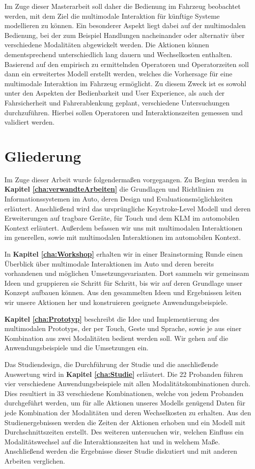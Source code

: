 Im Zuge dieser Masterarbeit soll daher die Bedienung im Fahrzeug beobachtet werden, mit dem Ziel die multimodale Interaktion für künftige Systeme modellieren zu können.
Ein besonderer Aspekt liegt dabei auf der multimodalen Bedienung, bei der zum Beispiel Handlungen nacheinander oder alternativ über verschiedene Modalitäten abgewickelt werden.
Die Aktionen können dementsprechend unterschiedlich lang dauern und Wechselkosten enthalten.
Basierend auf den empirisch zu ermittelnden Operatoren und Operatorzeiten soll dann ein erweitertes Modell erstellt werden, welches die Vorhersage für eine multimodale Interaktion im Fahrzeug ermöglicht.
Zu diesem Zweck ist es sowohl unter den Aspekten der Bedienbarkeit und User Experience, als auch der Fahrsicherheit und Fahrerablenkung geplant, verschiedene Untersuchungen durchzuführen.
Hierbei sollen Operatoren und Interaktionszeiten gemessen und validiert werden. 

\section*{Gliederung}
Im Zuge dieser Arbeit wurde folgendermaßen vorgegangen.
Zu Beginn werden in \textbf{Kapitel \ref{cha:verwandteArbeiten}} die Grundlagen und Richtlinien zu Informationssystemen im Auto, deren Design und Evaluationsmöglichkeiten erläutert.
Anschließend wird das ursprüngliche Keystroke-Level Modell und deren Erweiterungen auf tragbare Geräte, für Touch und dem KLM im automobilen Kontext erläutert.
Außerdem befassen wir uns mit multimodalen Interaktionen im generellen, sowie mit multimodalen Interaktionen im automobilen Kontext. 

In \textbf{Kapitel \ref{cha:Workshop}} erhalten wir in einer Brainstorming Runde einen Überblick über multimodale Interaktionen im Auto und deren bereits vorhandenen und möglichen Umsetzungsvarianten.
Dort sammeln wir gemeinsam Ideen und gruppieren sie Schritt für Schritt, bis wir auf deren Grundlage unser Konzept aufbauen können.
Aus den gesammelten Ideen und Ergebnissen leiten wir unsere Aktionen her und konstruieren geeignete Anwendungsbeispiele. 

\textbf{Kapitel \ref{cha:Prototyp}} beschreibt die Idee und Implementierung des multimodalen Prototyps, der per Touch, Geste und Sprache, sowie je aus einer Kombination aus zwei Modalitäten bedient werden soll. 
Wir gehen auf die Anwendungsbeispiele und die Umsetzungen ein. 

Das Studiendesign, die Durchführung der Studie und die anschließende Auswertung wird in \textbf{Kapitel \ref{cha:Studie}} erläutert.
Die 22 Probanden führen vier verschiedene Anwendungsbeispiele mit allen Modalitätskombinationen durch.
Dies resultiert in 33 verschiedene Kombinationen, welche von jedem Probanden durchgeführt werden, um für alle Aktionen unseres Modells genügend Daten für jede Kombination der Modalitäten und deren Wechselkosten zu erhalten.
Aus den Studienergebnissen werden die Zeiten der Aktionen erhoben und ein Modell mit Durchschnittszeiten erstellt.
Des weiteren untersuchen wir, welchen Einfluss ein Modalitätswechsel auf die Interaktionszeiten hat und in welchem Maße.
Anschließend werden die Ergebnisse dieser Studie diskutiert und mit anderen Arbeiten verglichen.

